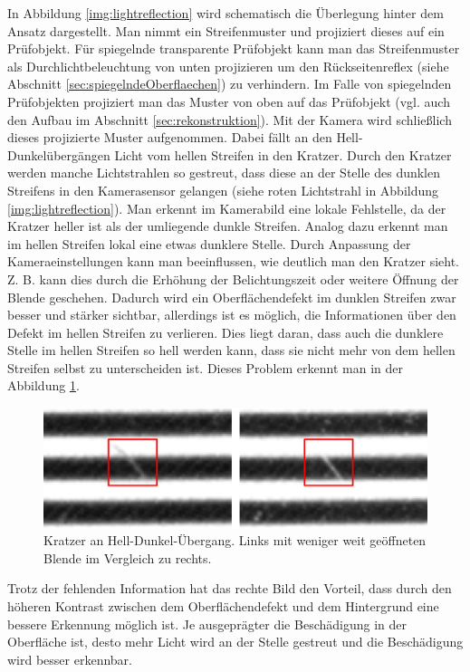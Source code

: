\noindent
In Abbildung \ref{img:lightreflection} wird schematisch die Überlegung hinter dem Ansatz dargestellt.
Man nimmt ein Streifenmuster und projiziert dieses auf ein Prüfobjekt.
Für spiegelnde transparente Prüfobjekt kann man das Streifenmuster als Durchlichtbeleuchtung von unten projizieren um den Rückseitenreflex (siehe Abschnitt \ref{sec:spiegelndeOberflaechen}) zu verhindern.
Im Falle von spiegelnden Prüfobjekten projiziert man das Muster von oben auf das Prüfobjekt (vgl. auch den Aufbau im Abschnitt \ref{sec:rekonstruktion}).
Mit der Kamera wird schließlich dieses projizierte Muster aufgenommen.
Dabei fällt an den Hell-Dunkelübergängen Licht vom hellen Streifen in den Kratzer.
Durch den Kratzer werden manche Lichtstrahlen so gestreut, dass diese an der Stelle des dunklen Streifens in den Kamerasensor gelangen (siehe roten Lichtstrahl in Abbildung \ref{img:lightreflection}).
Man erkennt im Kamerabild eine lokale Fehlstelle, da der Kratzer heller ist als der umliegende dunkle Streifen.
Analog dazu erkennt man im hellen Streifen lokal eine etwas dunklere Stelle.
Durch Anpassung der Kameraeinstellungen kann man beeinflussen, wie deutlich man den Kratzer sieht.
Z. B. kann dies durch die Erhöhung der Belichtungszeit oder weitere Öffnung der Blende geschehen.
Dadurch wird ein Oberflächendefekt im dunklen Streifen zwar besser und stärker sichtbar, allerdings ist es möglich, die Informationen über den Defekt im hellen Streifen zu verlieren.
Dies liegt daran, dass auch die dunklere Stelle im hellen Streifen so hell werden kann, dass sie nicht mehr von dem hellen Streifen selbst zu unterscheiden ist.
Dieses Problem erkennt man in der Abbildung \ref{img:scratches}.

\begin{figure}[H]
	\centering
	\includegraphics[width=\textwidth]{03_sichtpruefungDurchLichtstreuung/verfahren/figures/visibleScratch}
	\caption[Kratzer]{Kratzer an Hell-Dunkel-Übergang. Links mit weniger weit geöffneten Blende im Vergleich zu rechts.}
	\label{img:scratches}
\end{figure}

\noindent
Trotz der fehlenden Information hat das rechte Bild den Vorteil, dass durch den höheren Kontrast zwischen dem Oberflächendefekt und dem Hintergrund eine bessere Erkennung möglich ist.
Je ausgeprägter die Beschädigung in der Oberfläche ist, desto mehr Licht wird an der Stelle gestreut und die Beschädigung wird besser erkennbar.

